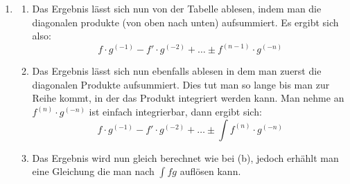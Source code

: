 \documentclass[7pt,landscape, margin = 0.1mm]{article}
\begin{document}
\begin{multicols}{4}
{\begin{enumerate}
\begin{center}
\begin{tabular}{l|ll}
    & $D$ & $I$ \\ \hline
$+$   & $f$   & $g$   \\
$-$   &  $f'$ &  $\int g = g^{(-1)}$ \\ 
$+$   & $f''$  &   $g^{(-2)}$ \\ 
$\ldots$   &  &   \\ 
$\pm$ & $f^{(n)} = 0$  &  $g^{(-n)}$  \\ 
\end{tabular}
\end{center}
\item
\begin{enumerate}
\item Das Ergebnis lässt sich nun von der Tabelle ablesen, indem man die diagonalen produkte (von oben nach unten) aufsummiert. Es ergibt sich also:
$$f \cdot g^{(-1)} - f'\cdot g^{(-2)}  + \ldots  \pm f^{(n-1)}\cdot g^{(-n)}$$
\item Das Ergebnis lässt sich nun ebenfalls ablesen in dem man zuerst die diagonalen Produkte aufsummiert. Dies tut man so lange bis man zur Reihe kommt, in der das Produkt integriert werden kann. Man nehme an $f^{(n)} \cdot g^{(-n)}$ ist einfach integrierbar, dann ergibt sich:
$$ f \cdot g^{(-1)} - f'\cdot g^{(-2)}  + \ldots  \pm \int f^{(n)}\cdot g^{(-n)}$$
\item Das Ergebnis wird nun gleich berechnet wie bei (b), jedoch erhählt man eine Gleichung die man nach $\int fg$ auflösen kann.

\end{enumerate}

\end{enumerate}
}


\end{multicols}
\end{document}

